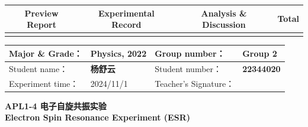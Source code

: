 


\begin{table}
	\renewcommand\arraystretch{1.7}
	\begin{tabularx}{\textwidth}{
			|X|X|X|X
			|X|X|X|X|}
		\hline
		\multicolumn{2}{|c|}{Preview Report}&\multicolumn{2}{|c|}{Experimental Record}&\multicolumn{2}{|c|}{Analysis \& Discussion}&\multicolumn{2}{|c|}{\Large\textbf{Total}}\\
		\hline
		\LARGE & & \LARGE & & \LARGE & & \LARGE & \\
		\hline
	\end{tabularx}
\end{table}


\begin{table}
	\renewcommand\arraystretch{1.7}
	\begin{tabularx}{\textwidth}{|X|X|X|X|}
		\hline
		Major \& Grade： & Physics, 2022 &Group number： & Group 2\\
		\hline
		Student name： & \textbf{杨舒云}  & Student number： & \textbf{22344020}\\
		\hline
		Experiment time： & 2024/11/1 & Teacher's Signature： & \\
		\hline
	\end{tabularx}
\end{table}


\begin{center}
	\huge \textbf{APL1-4 \quad 电子自旋共振实验\\Electron Spin Resonance Experiment (ESR)}
\end{center}


